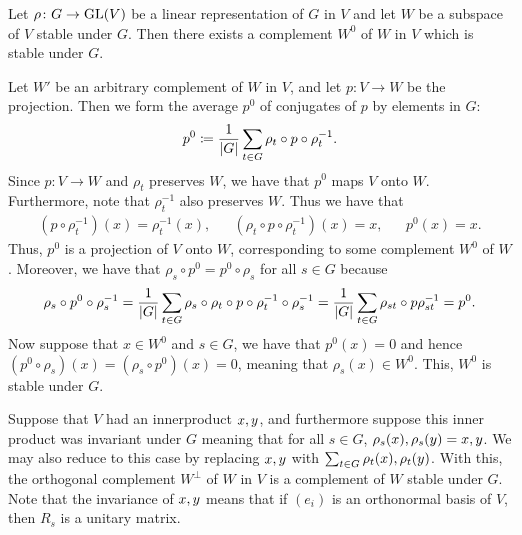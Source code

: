 \documentclass[letterpaper, 11pt, oneside]{book}
\begin{document}
\begin{thrm}\label{thrm:stable_complements_of_subspace}
  Let $\rho\colon G \to \operatorname{GL}(V)$ be a linear representation of $G$ in $V$ and let $W$ be a subspace of $V$ stable under $G$.
  Then there exists a complement $W^{0}$ of $W$ in $V$ which is stable under $G$.
\end{thrm}
\begin{pf}
  Let $W'$ be an arbitrary complement of $W$ in $V$, and let $p\colon V \to W$ be the projection.
  Then we form the average $p^{0}$ of conjugates of $p$ by elements in $G$:
  \[
    p^{0} \coloneqq \frac{1}{\abs{G}} \sum_{t \in G} \rho_{t} \circ p \circ \rho_{t}^{-1}.
  \]
  Since $p\colon V \to W$ and $\rho_{t}$ preserves $W$, we have that $p^{0}$ maps $V$ onto $W$.
  Furthermore, note that $\rho_{t}^{-1}$ also preserves $W$.
  \clearpage
  Thus we have that
  \begin{align*}
    (p \circ \rho_{t}^{-1})(x) = \rho_{t}^{-1}(x), && (\rho_{t} \circ p \circ \rho_{t}^{-1})(x) = x, && p^{0}(x) = x.
  \end{align*}
  Thus, $p^{0}$ is a projection of $V$ onto $W$, corresponding to some complement $W^{0}$ of $W$.
  Moreover, we have that $\rho_{s} \circ p^{0} = p^{0} \circ \rho_{s}$ for all $s \in G$ because
  \[
    \rho_{s} \circ p^{0} \circ \rho_{s}^{-1} = \frac{1}{\abs{G}} \sum_{t \in G} \rho_{s} \circ \rho_{t} \circ p \circ \rho_{t}^{-1} \circ \rho_{s}^{-1} = \frac{1}{\abs{G}} \sum_{t \in G} \rho_{st} \circ p \rho_{st}^{-1} = p^{0}.
  \]
  Now suppose that $x \in W^{0}$ and $s \in G$, we have that $p^{0}(x) = 0$ and hence $(p^{0} \circ \rho_{s})(x) = (\rho_{s} \circ p^{0})(x) = 0$, meaning that $\rho_{s}(x) \in W^{0}$.
  This, $W^{0}$ is stable under $G$.
\end{pf}

Suppose that $V$ had an innerproduct $\inner{x, y}$, and furthermore suppose this inner product was invariant under $G$ meaning that for all $s \in G$, $\inner{\rho_{s}(x), \rho_{s}(y)} = \inner{x, y}$.
We may also reduce to this case by replacing $\inner{x, y}$ with $\sum_{t \in G}\inner{\rho_{t}(x), \rho_{t}(y)}$.
With this, the orthogonal complement $W^{\bot}$ of $W$ in $V$ is a complement of $W$ stable under $G$.
Note that the invariance of $\inner{x, y}$ means that if $(e_{i})$ is an orthonormal basis of $V$, then $R_{s}$ is a unitary matrix.
\end{document}
